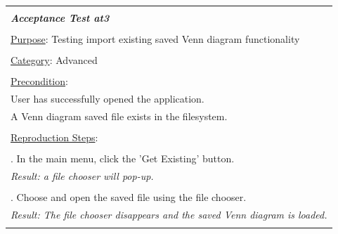 \documentclass[fontsize=12pt,paper=letter,twoside]{scrartcl}
\begin{document}
\begin{table}[!h]
	\begin{tabular}{|l|}
		\hline
		\\
		\textbf{\emph{Acceptance Test at3}} 	
		\\\\
		\underline{Purpose}: Testing import existing saved Venn diagram functionality \\
		\\
		\underline{Category}: Advanced		\\
		\\
		\underline{Precondition}:															\\ \qquad
		User has successfully opened the application.
		\\ \qquad
		A Venn diagram saved file exists in the filesystem.
		\\\\
		\underline{Reproduction Steps}:				
		\\\\ \qquad 1. In the main menu, click the 'Get Existing' button.
		\\ \qquad \textit{Result: a file chooser will pop-up.} 
		\\\\ \qquad 2. Choose and open the saved file using the file chooser.
		\\ \qquad \textit{Result: The file chooser disappears and the saved Venn diagram is loaded.} 
		\\\\
		\hline
	\end{tabular}
\end{table}

\newpage
\end{document}
